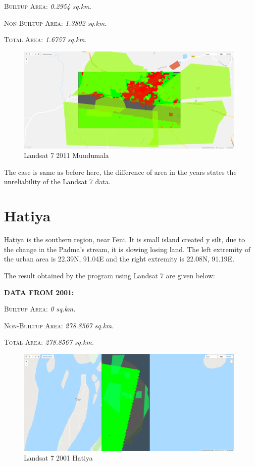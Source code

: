 \documentclass{article}
\begin{document}
\textsc{Builtup Area: } \textit{0.2954 sq.km.}

\textsc{Non-Builtup Area: } \textit{1.3802 sq.km.}

\textsc{Total Area: } \textit{1.6757 sq.km.}

\begin{figure}[H]
\centering
\includegraphics[width=\textwidth]{2011_Mundumala_L7}
\caption{Landsat 7 2011 Mundumala}
\end{figure}

The case is same as before here, the difference of area in the years states the unreliability of the Landsat 7 data.

\section{Hatiya}
Hatiya is the southern region, near Feni. It is small island created y silt, due to the change in the Padma's stream, it is slowing losing land. The left extremity of the urban area is 22.39\degree N, 91.04\degree E and the right extremity is 22.08\degree N, 91.19\degree E.

The result obtained by the program using \textsf{Landsat 7} are given below:

\textbf{DATA FROM 2001:}

\textsc{Builtup Area: } \textit{0 sq.km.}

\textsc{Non-Builtup Area: } \textit{278.8567 sq.km.}

\textsc{Total Area: } \textit{278.8567 sq.km.}

\begin{figure}[H]
\centering
\includegraphics[width=\textwidth]{2001_Hatiya_L7}
\caption{Landsat 7 2001 Hatiya}
\end{figure}
\end{document}
